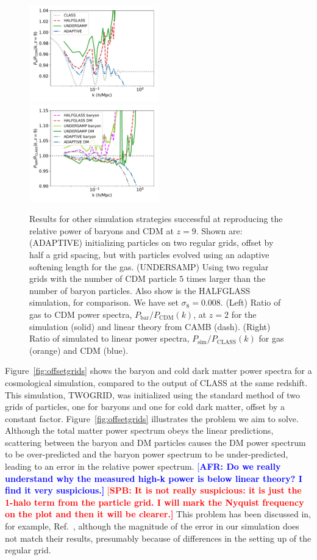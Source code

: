 \documentclass[a4paper,11pt]{article}
\newcommand{\spb}[1]{\textcolor{red}{[\bf SPB: #1]} }
\newcommand{\AFR}[1]{\textcolor{blue}{[\bf AFR: #1]} }
\begin{document}
\begin{figure}
\includegraphics[width=0.5\textwidth]{plots/oversample_9_relpower.pdf}
  \includegraphics[width=0.5\textwidth]{plots/oversample_9_class.pdf}
\caption{Results for other simulation strategies successful at reproducing the relative power of baryons and CDM at $z=9$. Shown are: (ADAPTIVE) initializing particles on two regular grids, offset by half a grid spacing, but with particles evolved using an adaptive softening length for the gas. (UNDERSAMP) Using two regular grids with the number of CDM particle $5$ times larger than the number of baryon particles. Also show is the HALFGLASS simulation, for comparison. We have set $\sigma_8 = 0.008$. (Left) Ratio of gas to CDM power spectra, $P_\mathrm{bar}/P_\mathrm{CDM}(k)$, at $z=2$ for the simulation (solid) and linear theory from CAMB (dash). (Right) Ratio of simulated to linear power spectra, $P_\mathrm{sim}/P_\mathrm{CLASS}(k)$ for gas (orange) and CDM (blue).}
  \label{fig:adaptivez9}
\end{figure}


Figure~\ref{fig:offsetgrids} shows the baryon and cold dark matter power spectra for a cosmological simulation, compared to the output of CLASS at the same redshift. This simulation, TWOGRID, was initialized using the standard method of two grids of particles, one for baryons and one for cold dark matter, offset by a constant factor. Figure~\ref{fig:offsetgrids} illustrates the problem we aim to solve. Although the total matter power spectrum obeys the linear predictions, scattering between the baryon and DM particles causes the DM power spectrum to be over-predicted and the baryon power spectrum to be under-predicted, leading to an error in the relative power spectrum. 
\AFR{Do we really understand why the measured high-k power is below linear theory? I find it very suspicious.}\spb{It is not really suspicious: it is just the 1-halo term from the particle grid. I will mark the Nyquist frequency on the plot and then it will be clearer.}
This problem has been discussed in, for example, Ref.~\cite{Angulo:2013}, although the magnitude of the error in our simulation does not match their results, presumably because of differences in the setting up of the regular grid.
\end{document}
